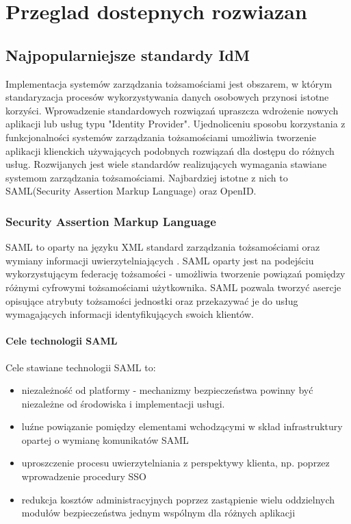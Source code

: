 \chapter{Przeglad dostepnych rozwiazan}
\label{cha:przegladRozwiazan}


\section{Najpopularniejsze standardy IdM}
\label{sec:standardyIdM}

Implementacja systemów zarządzania tożsamościami jest obszarem, w którym standaryzacja procesów wykorzystywania danych osobowych przynosi istotne korzyści. Wprowadzenie standardowych rozwiązań upraszcza wdrożenie nowych aplikacji lub usług typu "Identity Provider". Ujednoliceniu sposobu korzystania z funkcjonalności systemów zarządzania tożsamościami umożliwia tworzenie aplikacji klienckich używających podobnych rozwiązań dla dostępu do różnych usług. Rozwijanych jest wiele standardów realizujących wymagania stawiane systemom zarządzania tożsamościami. Najbardziej istotne z nich to SAML(Security Assertion Markup Language) oraz OpenID. 

\subsection{Security Assertion Markup Language}

	SAML to oparty na języku XML standard zarządzania tożsamościami oraz wymiany informacji uwierzytelniających \cite{Wisniewski05}. SAML oparty jest na podejściu wykorzystującym federację tożsamości - umożliwia tworzenie powiązań pomiędzy różnymi cyfrowymi tożsamościami użytkownika. SAML pozwala tworzyć asercje opisujące atrybuty tożsamości jednostki oraz przekazywać je do usług wymagających informacji identyfikujących swoich klientów.

	\subsubsection{Cele technologii SAML}

		Cele stawiane technologii SAML to\cite{Wisniewski05}:

		\begin{itemize}
		  \item niezależność od platformy - mechanizmy bezpieczeństwa powinny być niezależne od środowiska i implementacji usługi.
		  \item luźne powiązanie pomiędzy elementami wchodzącymi w skład infrastruktury opartej o wymianę komunikatów SAML
		  \item uproszczenie procesu uwierzytelniania z perspektywy klienta, np. poprzez wprowadzenie procedury SSO
		  \item redukcja kosztów administracyjnych poprzez zastąpienie wielu oddzielnych modułów bezpieczeństwa jednym wspólnym dla  różnych aplikacji
		\end{itemize}

